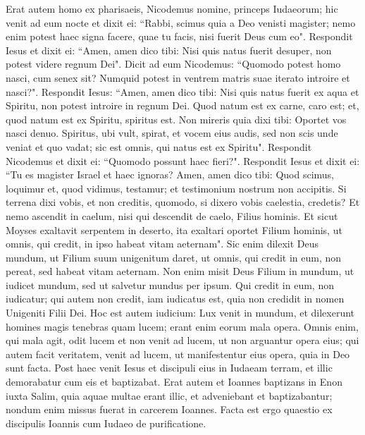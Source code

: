 \begin{biblechapter} 
\verse Erat autem homo ex pharisaeis, Nicodemus nomine, princeps Iudaeorum; 
\verse hic venit ad eum nocte et dixit ei: “Rabbi, scimus quia a Deo venisti magister; nemo enim potest haec signa facere, quae tu facis, nisi fuerit Deus cum eo". 
\verse Respondit Iesus et dixit ei: “Amen, amen dico tibi: Nisi quis natus fuerit desuper, non potest videre regnum Dei". 
\verse Dicit ad eum Nicodemus: “Quomodo potest homo nasci, cum senex sit? Numquid potest in ventrem matris suae iterato introire et nasci?". 
\verse Respondit Iesus: “Amen, amen dico tibi: Nisi quis natus fuerit ex aqua et Spiritu, non potest introire in regnum Dei. 
\verse Quod natum est ex carne, caro est; et, quod natum est ex Spiritu, spiritus est. 
\verse Non mireris quia dixi tibi: Oportet vos nasci denuo. 
\verse Spiritus, ubi vult, spirat, et vocem eius audis, sed non scis unde veniat et quo vadat; sic est omnis, qui natus est ex Spiritu". 
\verse Respondit Nicodemus et dixit ei: “Quomodo possunt haec fieri?". 
\verse Respondit Iesus et dixit ei: “Tu es magister Israel et haec ignoras? 
\verse Amen, amen dico tibi: Quod scimus, loquimur et, quod vidimus, testamur; et testimonium nostrum non accipitis. 
\verse Si terrena dixi vobis, et non creditis, quomodo, si dixero vobis caelestia, credetis? 
\verse Et nemo ascendit in caelum, nisi qui descendit de caelo, Filius hominis. 
\verse Et sicut Moyses exaltavit serpentem in deserto, ita exaltari oportet Filium hominis, 
\verse ut omnis, qui credit, in ipso habeat vitam aeternam". 
\verse Sic enim dilexit Deus mundum, ut Filium suum unigenitum daret, ut omnis, qui credit in eum, non pereat, sed habeat vitam aeternam. 
\verse Non enim misit Deus Filium in mundum, ut iudicet mundum, sed ut salvetur mundus per ipsum. 
\verse Qui credit in eum, non iudicatur; qui autem non credit, iam iudicatus est, quia non credidit in nomen Unigeniti Filii Dei. 
\verse Hoc est autem iudicium: Lux venit in mundum, et dilexerunt homines magis tenebras quam lucem; erant enim eorum mala opera. 
\verse Omnis enim, qui mala agit, odit lucem et non venit ad lucem, ut non arguantur opera eius; 
\verse qui autem facit veritatem, venit ad lucem, ut manifestentur eius opera, quia in Deo sunt facta. 
\verse Post haec venit Iesus et discipuli eius in Iudaeam terram, et illic demorabatur cum eis et baptizabat. 
\verse Erat autem et Ioannes baptizans in Enon iuxta Salim, quia aquae multae erant illic, et adveniebant et baptizabantur; 
\verse nondum enim missus fuerat in carcerem Ioannes. 
\verse Facta est ergo quaestio ex discipulis Ioannis cum Iudaeo de purificatione.  

\end{biblechapter}
